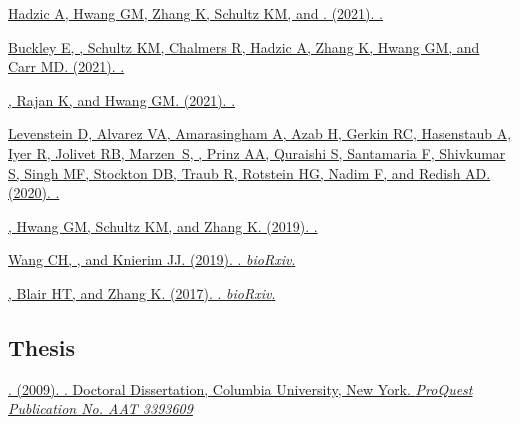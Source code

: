 \begin{description}
  \item \href{https://arxiv.org/abs/2111.00599}{Hadzic A, Hwang GM, Zhang K,
      Schultz KM, and . (2021). .
    }
  \item \href{https://arxiv.org/abs/2109.05545}{Buckley E, ,
      Schultz KM, Chalmers R, Hadzic A, Zhang K, Hwang GM, and Carr MD. (2021).
    . }
  \item \href{https://arxiv.org/abs/2105.07284}
    {, Rajan K, and Hwang GM. (2021). .
    }
  \item \href{https://arxiv.org/abs/2003.13825}
    {Levenstein D, Alvarez VA, Amarasingham A, Azab H, Gerkin RC, Hasenstaub
      A, Iyer R, Jolivet RB, Marzen~S, , Prinz AA, Quraishi
      S, Santamaria F, Shivkumar S, Singh MF, Stockton DB, Traub R, Rotstein
      HG, Nadim F, and Redish AD. (2020). . }
  \item \href{https://arxiv.org/abs/1909.06711}
    {, Hwang GM, Schultz KM, and Zhang K. (2019).
    . }
  \item \href{https://dx.doi.org/10.1101/764282}
    {Wang CH, , and Knierim JJ. (2019). . \emph{bioRxiv}.
    }
  \item \href{https://dx.doi.org/10.1101/211458}
    {, Blair HT, and Zhang K. (2017). . \emph{bioRxiv}. }
\end{description}

\subsection*{Thesis}
\label{sec:thesis}

\begin{description}
  \item \href{https://search.proquest.com/docview/304862872/abstract}
    {. (2009). . Doctoral Dissertation, Columbia University, New
    York. \emph{ProQuest Publication No. AAT 3393609}}
\end{description}

